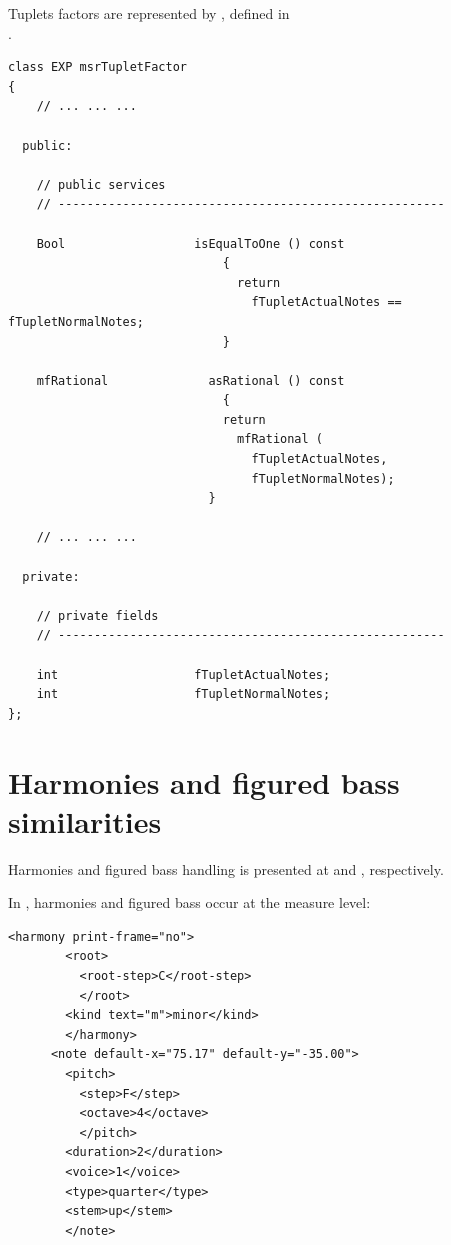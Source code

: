 Tuplets factors are represented by , defined in\\
.
\begin{lstlisting}[language=CPlusPlus]
class EXP msrTupletFactor
{
	// ... ... ...

  public:

    // public services
    // ------------------------------------------------------

    Bool                  isEqualToOne () const
                              {
                                return
                                  fTupletActualNotes == fTupletNormalNotes;
                              }

    mfRational              asRational () const
                              {
                              return
                                mfRational (
                                  fTupletActualNotes,
                                  fTupletNormalNotes);
                            }

	// ... ... ...

  private:

    // private fields
    // ------------------------------------------------------

    int                   fTupletActualNotes;
    int                   fTupletNormalNotes;
};
\end{lstlisting}


\section{Harmonies and figured bass similarities}\label{Harmonies and figured bass similarities}

Harmonies and figured bass handling is presented at  and , respectively.

In \mxml, harmonies and figured bass occur at the measure level:
\begin{lstlisting}[language=MusicXML]
      <harmony print-frame="no">
        <root>
          <root-step>C</root-step>
          </root>
        <kind text="m">minor</kind>
        </harmony>
      <note default-x="75.17" default-y="-35.00">
        <pitch>
          <step>F</step>
          <octave>4</octave>
          </pitch>
        <duration>2</duration>
        <voice>1</voice>
        <type>quarter</type>
        <stem>up</stem>
        </note>
\end{lstlisting}

